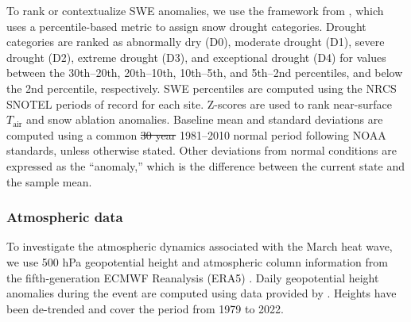 \documentclass[draft]{agujournal2019}
\newcommand{\fig}[2]{\textcolor{red}{(Fig.~\ref{#1}{#2})}}   %
\newcommand{\tair}{\textcolor{black}{$T_{\mathrm{air}}$}\xspace}
\providecommand{\DIFadd}[1]{{\protect\color{blue}\uwave{#1}}} %
\providecommand{\DIFdel}[1]{{\protect\color{red}\sout{#1}}}                      %
\providecommand{\DIFaddbegin}{} %
\providecommand{\DIFaddend}{} %
\providecommand{\DIFdelbegin}{} %
\providecommand{\DIFdelend}{} %
\begin{document}
To rank or contextualize SWE anomalies, we use the framework from , which uses a percentile-based metric to assign snow drought categories.
Drought categories are ranked as abnormally dry (D0), moderate drought (D1), severe drought (D2), extreme drought (D3), and exceptional drought (D4) for values between the 30th--20th, 20th--10th, 10th--5th, and 5th--2nd percentiles, and below the 2nd percentile, respectively.
SWE percentiles are computed using the NRCS SNOTEL periods of record for each site.
Z-scores are used to rank near-surface \tair and snow ablation anomalies.
Baseline mean and standard deviations are computed using a common \DIFdelbegin \DIFdel{30 year }\DIFdelend \DIFaddbegin \DIFadd{30-year }\DIFaddend 1981--2010 normal period following NOAA standards, unless otherwise stated.
Other deviations from normal conditions are expressed as the ``anomaly,'' which is the difference between the current state and the sample mean.




\subsubsection{Atmospheric data}
To investigate the atmospheric dynamics associated with the March heat wave, we use 500 hPa geopotential height and atmospheric column information from the fifth-generation ECMWF Reanalysis (ERA5) \cite{Hersbach2020-era5}.
Daily geopotential height anomalies during the event are computed using data provided by .
Heights have been de-trended and cover the period from 1979 to 2022.
\end{document}
